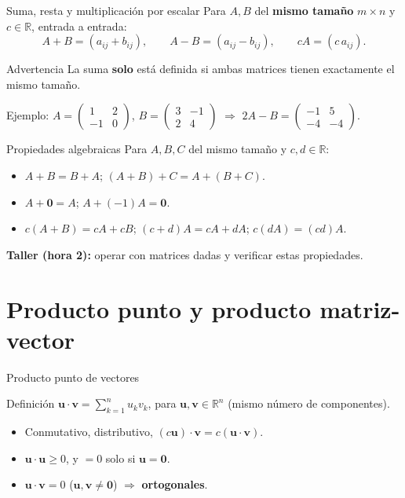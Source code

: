 \documentclass[11pt]{beamer}
\newcommand{\R}{\mathbb{R}}
\newcommand{\vv}[1]{\mathbf{#1}}
\begin{document}
\begin{frame}{Suma, resta y multiplicación por escalar}
  Para $A,B$ del \textbf{mismo tamaño} $m\times n$ y $c\in\R$, entrada a entrada:
  \[
    A+B = (a_{ij}+b_{ij}), \qquad A-B=(a_{ij}-b_{ij}), \qquad cA=(c\,a_{ij}).
  \]
  \begin{alertblock}{Advertencia}
    La suma \textbf{solo} está definida si ambas matrices tienen exactamente el mismo tamaño.
  \end{alertblock}
  \vfill
  Ejemplo: $A=\begin{pmatrix}1&2\\-1&0\end{pmatrix}$, $B=\begin{pmatrix}3&-1\\2&4\end{pmatrix}$
  $\Rightarrow$ $2A-B=\begin{pmatrix}-1&5\\-4&-4\end{pmatrix}$.
\end{frame}

\begin{frame}{Propiedades algebraicas}
  Para $A,B,C$ del mismo tamaño y $c,d\in\R$:
  \begin{itemize}
    \item $A+B=B+A$; \quad $(A+B)+C=A+(B+C)$.
    \item $A+\vv{0}=A$; \quad $A+(-1)A=\vv{0}$.
    \item $c(A+B)=cA+cB$; \quad $(c+d)A=cA+dA$; \quad $c(dA)=(cd)A$.
  \end{itemize}
  \vfill
  \textbf{Taller (hora 2):} operar con matrices dadas y verificar estas propiedades.
\end{frame}

\section{Producto punto y producto matriz-vector}

\begin{frame}{Producto punto de vectores}
  \begin{block}{Definición}
    $\vv{u}\cdot\vv{v} = \sum_{k=1}^n u_kv_k$, para $\vv{u},\vv{v}\in\R^n$ (mismo número de
    componentes).
  \end{block}
  \begin{itemize}
    \item Conmutativo, distributivo, $(c\vv{u})\cdot\vv{v}=c(\vv{u}\cdot\vv{v})$.
    \item $\vv{u}\cdot\vv{u}\geq 0$, y $=0$ solo si $\vv{u}=\vv{0}$.
    \item $\vv{u}\cdot\vv{v}=0$ ($\vv{u},\vv{v}\neq\vv{0}$) $\Rightarrow$ \textbf{ortogonales}.
  \end{itemize}
\end{frame}
\end{document}
